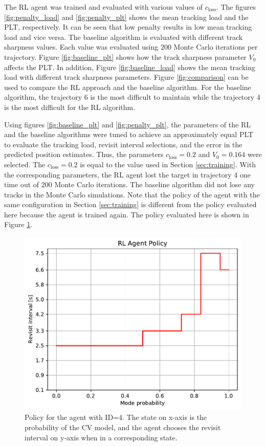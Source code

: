 \documentclass[english, 12pt, a4paper, elec, utf8, a-1b, online]{aaltothesis}
\newcommand{\closs}{c_\text{loss}}
\begin{document}
The RL agent was trained and evaluated with various values of $\closs$.
The figures \ref{fig:penalty_load} and \ref{fig:penalty_plt} shows the mean tracking load and the PLT, respectively.
It can be seen that low penalty results in low mean tracking load and vice versa.
The baseline algorithm is evaluated with different track sharpness values.
Each value was evaluated using $200$ Monte Carlo iterations per trajectory.
Figure \ref{fig:baseline_plt} shows how the track sharpness parameter $V_0$ affects the PLT.
In addition, Figure \ref{fig:baseline_load} shows the mean tracking load with different track sharpness parameters.
Figure \ref{fig:comparison} can be used to compare the RL approach and the baseline algorithm.
For the baseline algorithm, the trajectory 6 is the most difficult to maintain while the trajectory 4 is the most difficult for the RL algorithm.

Using figures \ref{fig:baseline_plt} and \ref{fig:penalty_plt}, the parameters of the RL and the baseline algorithms were tuned to achieve an approximately equal PLT to evaluate the tracking load, revisit interval selections, and the error in the predicted position estimates.
Thus, the parameters $\closs = 0.2$ and $V_0=0.164$ were selected.
The $\closs=0.2$ is equal to the value used in Section \ref{sec:training}.
With the corresponding parameters, the RL agent lost the target in trajectory 4 one time out of 200 Monte Carlo iterations.
The baseline algorithm did not lose any tracks in the Monte Carlo simulations.
Note that the policy of the agent with the same configuration in Section \ref{sec:training} is different from the policy evaluated here because the agent is trained again.
The policy evaluated here is shown in Figure \ref{fig:policy_id4}.

\begin{figure}[tb]
    \centering
    \includegraphics[width=.8\linewidth]{figures/benchmark/Training/policy.pdf}
    \caption{Policy for the agent with ID=4. The state on x-axis is the probability of the CV model, and the agent chooses the revisit interval on y-axis when in a corresponding state.}
    \label{fig:policy_id4}
\end{figure}
\end{document}
